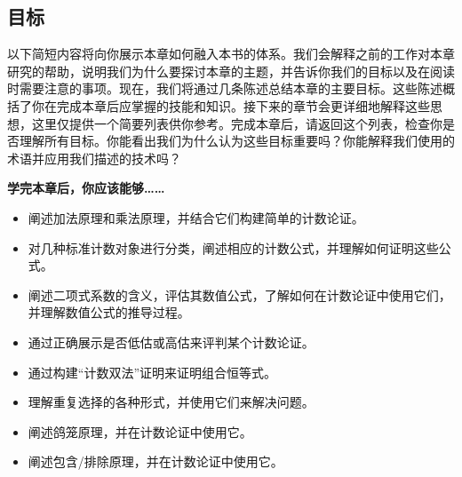 
\subsection{目标}

以下简短内容将向你展示本章如何融入本书的体系。我们会解释之前的工作对本章研究的帮助，说明我们为什么要探讨本章的主题，并告诉你我们的目标以及在阅读时需要注意的事项。现在，我们将通过几条陈述总结本章的主要目标。这些陈述概括了你在完成本章后应掌握的技能和知识。接下来的章节会更详细地解释这些思想，这里仅提供一个简要列表供你参考。完成本章后，请返回这个列表，检查你是否理解所有目标。你能看出我们为什么认为这些目标重要吗？你能解释我们使用的术语并应用我们描述的技术吗？

\textbf{学完本章后，你应该能够……}

\begin{itemize}
    \item 阐述加法原理和乘法原理，并结合它们构建简单的计数论证。
    \item 对几种标准计数对象进行分类，阐述相应的计数公式，并理解如何证明这些公式。
    \item 阐述二项式系数的含义，评估其数值公式，了解如何在计数论证中使用它们，并理解数值公式的推导过程。
    \item 通过正确展示是否低估或高估来评判某个计数论证。
    \item 通过构建``计数双法''证明来证明组合恒等式。
    \item 理解重复选择的各种形式，并使用它们来解决问题。
    \item 阐述鸽笼原理，并在计数论证中使用它。
    \item 阐述包含/排除原理，并在计数论证中使用它。
\end{itemize}
